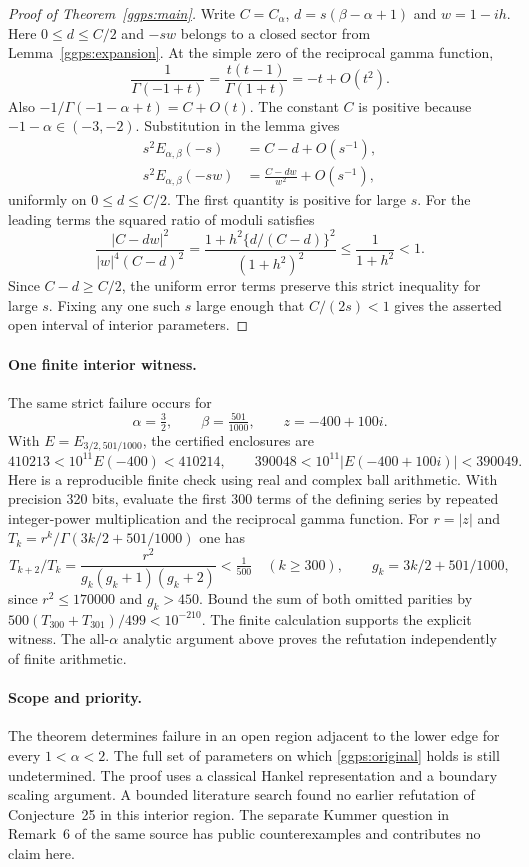 \documentclass[11pt,a4paper]{article}
\theoremstyle{definition}
\theoremstyle{remark}
\numberwithin{equation}{section}
\begin{document}
\begin{proof}[Proof of Theorem~\ref{ggps:main}]
Write $C=C_\alpha$, $d=s(\beta-\alpha+1)$ and $w=1-ih$.
Here $0\le d\le C/2$ and $-sw$ belongs to a closed sector from
Lemma~\ref{ggps:expansion}. At the simple zero of the reciprocal
gamma function,
\[
 \frac1{\Gamma(-1+t)}=\frac{t(t-1)}{\Gamma(1+t)}=-t+O(t^2).
\]
Also $-1/\Gamma(-1-\alpha+t)=C+O(t)$. The constant $C$ is positive
because $-1-\alpha\in(-3,-2)$. Substitution in the lemma gives
\begin{align*}
 s^2 E_{\alpha,\beta}(-s)&=C-d+O(s^{-1}),\\
 s^2 E_{\alpha,\beta}(-sw)&=\frac{C-dw}{w^2}+O(s^{-1}),
\end{align*}
uniformly on $0\le d\le C/2$. The first quantity is positive for
large $s$. For the leading terms the squared ratio of moduli satisfies
\[
 \frac{|C-dw|^2}{|w|^4(C-d)^2}
 =\frac{1+h^2\{d/(C-d)\}^2}{(1+h^2)^2}
 \le\frac1{1+h^2}<1.
\]
Since $C-d\ge C/2$, the uniform error terms preserve this strict
inequality for large $s$. Fixing any one such $s$ large enough that
$C/(2s)<1$ gives the asserted open interval of interior parameters.
\end{proof}

\paragraph{One finite interior witness.}
The same strict failure occurs for
\[
  \alpha=\tfrac32,\qquad \beta=\tfrac{501}{1000},\qquad
                z=-400+100i.
\]
With $E=E_{3/2,501/1000}$, the certified enclosures are
\[
 410213<10^{11}E(-400)<410214,\qquad
 390048<10^{11}|E(-400+100i)|<390049.
\]
Here is a reproducible finite check using real and complex ball
arithmetic. With precision 320 bits, evaluate the first 300 terms of
the defining series by repeated integer-power multiplication and the
reciprocal gamma function. For $r=|z|$ and
$T_k=r^k/\Gamma(3k/2+501/1000)$ one has
\[
 T_{k+2}/T_k=\frac{r^2}{g_k(g_k+1)(g_k+2)}<\tfrac1{500}
    \quad(k\ge300),\qquad g_k=3k/2+501/1000,
\]
since $r^2\le170000$ and $g_k>450$. Bound the sum of both omitted
parities by $500(T_{300}+T_{301})/499<10^{-210}$. The finite
calculation supports the explicit witness. The all-$\alpha$ analytic
argument above proves the refutation independently of finite arithmetic.

\paragraph{Scope and priority.}
The theorem determines failure in an open region adjacent to the
lower edge for every $1<\alpha<2$. The full set of parameters on
which \eqref{ggps:original} holds is still undetermined. The proof
uses a classical Hankel representation and a boundary scaling
argument. A bounded literature search found no earlier refutation
of Conjecture~25 in this interior region. The separate Kummer
question in Remark~6 of the same source has public counterexamples
and contributes no claim here.
\end{document}
